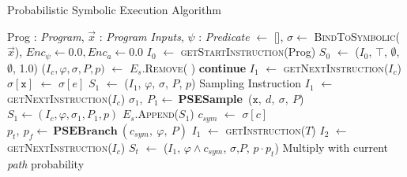 \documentclass[acmsmall,review,anonymous]{acmart}\settopmatter{printfolios=true,printccs=false,printacmref=false}
\newcommand*\Let[2]{\State #1 $\gets$ #2}
\begin{document}
\begin{algorithm}
	\caption{Probabilistic Symbolic Execution Algorithm}
	\label{alg:symb_ex}
	\begin{algorithmic}[1]
		 {\textsf{Prog} : \textit{Program}, $\vec{x}$ : \textit{Program Inputs}, \colorbox[RGB]{200, 200, 200}{$\psi$ : \textit{Predicate}}}
		 $\leftarrow$ {[]}, $\sigma \gets $ \textsc{BindToSymbolic}($\vec{x}$), \colorbox[RGB]{200, 200, 200}{$Enc_\psi \gets 0.0, Enc_a \gets 0.0$} \label{line:initialization} 
		\Let{$I_{0}$}{\textsc{getStartInstruction}(\textsf{Prog})} \label{line:first_inst}
		\Let{$S_{0}$}{($I_{0}$, $\top$, $\emptyset$, \colorbox[RGB]{200, 200, 200}{$\emptyset$, 1.0})} \label{line:init_state} 
		 
		 \label{line:execution_loop}
		\Let{($I_{c}, \varphi, \sigma, P, p)$}{$E_s$.\textsc{Remove}( )} \label{line:select_state}
		\State \textbf{continue}
		\EndIf
		 \label{line:inst_type}
		 \label{line:pse_assignment}  \label{line:symbex_assign}
		\Let{$I_1$}{\textsc{getNextInstruction}($I_{c}$)}
		\Let{$\sigma[\mathtt{x}]$}{$\sigma[e]$} \label{line:beg_raw_assign}
		\Let{$S_{1}$}{($I_{1}$, $\varphi$, $\sigma$, \colorbox[RGB]{200, 200, 200}{$P$, $p$})} \label{line:end_raw_assign}
		\EndCase
		 \algorithmiccomment \colorbox[RGB]{200, 200, 200}{Sampling Instruction} \label{line:pse_sampling}
		 $I_1$ $\gets$ \textsc{getNextInstruction}($I_{c}$)
		 {$\sigma_1,~P_1 \leftarrow~${\textbf{PSESample}}~({$\mathtt{x},~d,~\sigma,~P$})} \label{line:pse_sym_sample}
		 $S_1 \gets (I_{c}, \varphi, \sigma_1, P_1, p)$ \label{line:end_raw_sample}
		 $E_s$.\textsc{Append}({$S_1$})
     \label{line:end_pse_sampling}
		 \label{line:symbex_branch} 
		\Let{$c_{sym}$}{$\sigma[c]$} \label{line:guard_convert}
		\State \colorbox[RGB]{200, 200, 200}{$p_t,~p_f \leftarrow~\mathbf{PSEBranch}~(c_{sym},~\varphi,~P)$} \label{line:pse_sym_branch}
		\Let{$I_{1}$}{\textsc{getInstruction}($T$)} 
		\Let{$I_{2}$} {\textsc{getNextInstruction}($I_c$)}	
		\Let{$S_{t}$}{($I_{1}$, $\varphi \wedge c_{sym}$, $\sigma$,\colorbox[RGB]{200, 200, 200}{$P$, $p \cdot p_t$})} \label{line:symbex_true_state} \algorithmiccomment \colorbox[RGB]{200, 200, 200}{Multiply with current \textit{path} probability}

\end{algorithmic}
\end{algorithm}
\end{document}
